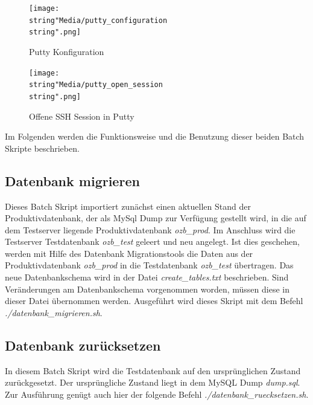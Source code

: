\documentclass[12pt,             %
               a4paper,          %
               listof=totoc,     %
               index=totoc,      %
               bibliography=totoc,%
               oneside,         %
               BCOR1cm,          %
               english   %
               ]{scrbook}
\begin{document}
\begin{figure}[H]
     \begin{center}
          \texttt{[image: \\string"Media/putty\_configuration\\string".png]}
     \end{center}
     \caption{Putty Konfiguration}
     \label{fig:putty_config}
\end{figure} 

\begin{figure}[H]
     \begin{center}
          \texttt{[image: \\string"Media/putty\_open\_session\\string".png]}
     \end{center}
     \caption{Offene SSH Session in Putty}
     \label{fig:putty_open_session}
\end{figure} 

Im Folgenden werden die Funktionsweise und die Benutzung dieser beiden Batch Skripte beschrieben. 

\subsection{Datenbank migrieren}
Dieses Batch Skript importiert zunächst einen aktuellen Stand der Produktivdatenbank, der als MySql Dump zur Verfügung gestellt wird, in die auf dem Testserver liegende Produktivdatenbank \textit{ozb\_prod}. Im Anschluss wird die Testserver Testdatenbank \textit{ozb\_test} geleert und neu angelegt. Ist dies geschehen, werden mit Hilfe des Datenbank Migrationstools die Daten aus der Produktivdatenbank \textit{ozb\_prod} in die Testdatenbank \textit{ozb\_test} übertragen. Das neue Datenbankschema wird in der Datei \textit{create\_tables.txt} beschrieben. Sind Veränderungen am Datenbankschema vorgenommen worden, müssen diese in dieser Datei übernommen werden. Ausgeführt wird dieses Skript mit dem Befehl \textit{./datenbank\_migrieren.sh}.\\



\subsection{Datenbank zurücksetzen}
In diesem Batch Skript wird die Testdatenbank auf den ursprünglichen Zustand zurückgesetzt. Der ursprüngliche Zustand liegt in dem MySQL Dump \textit{dump.sql}. Zur Ausführung genügt auch hier der folgende Befehl \textit{./datenbank\_ruecksetzen.sh}. \\
\end{document}
